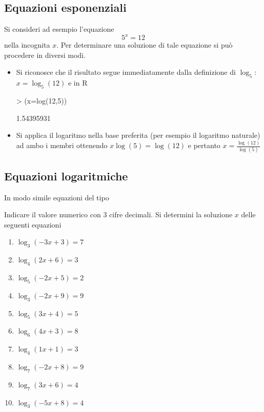 \documentclass[onecolumn,11pt]{book}
\newcommand{\rpr}{\textsf{R}~}
\begin{document}
\subsection{Equazioni esponenziali} Si consideri ad esempio l'equazione
\[ 5^{x}=12\]
nella incognita $x$.
Per determinare una soluzione di tale equazione si pu\`o procedere in diversi modi.
\begin{itemize}
\item Si riconosce che il risultato segue immediatamente dalla definizione di $\log_5$:
$x=\log_5(12)$
e in \rpr
\begin{Schunk}
\begin{Sinput}
> (x=log(12,5))
\end{Sinput}
\begin{Soutput}
[1] 1.54395931
\end{Soutput}
\end{Schunk}
\item Si applica il logaritmo nella base preferita (per esempio il logaritmo naturale)  ad ambo i membri ottenendo
$x\log(5)=\log(12)$ e pertanto $x=\frac{\log(12)}{\log(5)}$
\end{itemize}

\subsection{Equazioni logaritmiche}
In modo simile equazioni del tipo



Indicare il valore numerico con 3 cifre decimali. Si determini la soluzione $x$ delle seguenti equazioni
\begin{enumerate}
 \item  $\log_ 3 ( -3 x + 3 )= 7 $ \item  $\log_ 4 ( 2 x + 6 )= 3 $ \item  $\log_ 5 ( -2 x + 5 )= 2 $ \item  $\log_ 3 ( -2 x + 9 )= 9 $ \item  $\log_ 5 ( 3 x + 4 )= 5 $ \item  $\log_ 6 ( 4 x + 3 )= 8 $ \item  $\log_ 4 ( 1 x + 1 )= 3 $ \item  $\log_ 7 ( -2 x + 8 )= 9 $ \item  $\log_ 7 ( 3 x + 6 )= 4 $ \item  $\log_ 3 ( -5 x + 8 )= 4 $
\end{enumerate}
\end{document}
